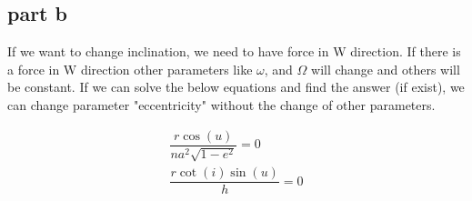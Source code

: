 \subsection{part b}

If we want to change inclination, we need to have force in W direction. If there is a force in W direction other parameters like $\omega$, and $\Omega$ will change and others will be constant. If we can solve the below equations and find the answer (if exist), we can change parameter "eccentricity" without the change of other parameters.

\begin{equation}
    \begin{aligned}
        \dfrac{r\cos(u)}{na^2\sqrt{1-e^2}} = 0\\
        \dfrac{r\cot(i)\sin(u)}{h} = 0
    \end{aligned}
\end{equation}